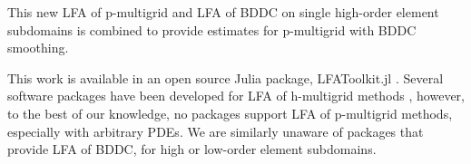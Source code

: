 This new LFA of p-multigrid and LFA of BDDC on single high-order element subdomains is combined to provide estimates for p-multigrid with BDDC smoothing.

This work is available in an open source Julia package, LFAToolkit.jl \cite{thompson2021toolkit}.
Several software packages have been developed for LFA of h-multigrid methods \cite{rittich2018extending,kahl2020automated,wienands2004practical}, however, to the best of our knowledge, no packages support LFA of p-multigrid methods, especially with arbitrary PDEs.
We are similarly unaware of packages that provide LFA of BDDC, for high or low-order element subdomains.
